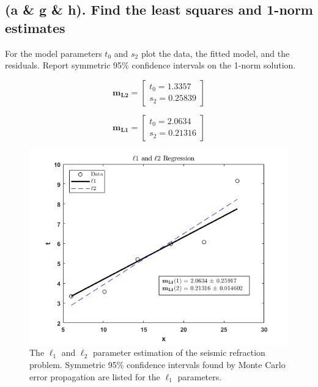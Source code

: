 \documentclass{article}
\begin{document}
\subsection*{(a \& g \& h). Find the least squares and 1-norm estimates}
For the model parameters $t_0$ and $s_2$ plot the data, the fitted model, and the residuals. Report symmetric 95\% confidence intervals on the 1-norm solution.
\vspace{-1pt}
\begin{figure}[!h]
\begin{minipage}{0.5\linewidth}
\begin{equation}
    \mathbf{m_{L2}} = \left[
    \begin{array}{c}
      t_0 = 1.3357  \\
        s_2 = 0.25839 
    \end{array}\right]
\end{equation}
\end{minipage}%
\begin{minipage}{0.5\linewidth}
\begin{equation}
    \mathbf{m_{L1}} = \left[
    \begin{array}{c}
        t_0 = 2.0634  \\
         s_2 = 0.21316 
    \end{array}\right]
\end{equation}
\end{minipage}
\end{figure}

\begin{figure}[b]
    \centering
    \includegraphics[width = .875\textwidth]{linearmodel_l1l2.png}
    \caption{The $\ell _1$ and $\ell _2$ parameter estimation of the seismic refraction problem. Symmetric 95\% confidence intervals found by Monte Carlo error propagation are listed for the $\ell_1$ parameters.}
    \label{fig:regression}
\end{figure}
\end{document}
